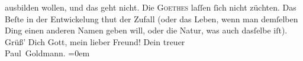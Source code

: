 \begin{ledgroupsized}[t]{13cm}
               ausbilden wollen, und das geht nicht. Die \textsc{Goethes} laſſen ſich nicht züchten. Das
               Beſte in der Entwickelung {\pb}thut der Zufall (oder das
               Leben, wenn man demſelben Ding einen anderen Namen geben will, oder die Natur, was
               auch dasſelbe iſt).\pend
           \pstart
           Grüß’ Dich Gott, mein lieber Freund!\pend
           \pstart
           Dein treuer {\\[\baselineskip]}\spacefill\mbox{Paul Goldmann.}\pend
           \leftskip=0em{}
         
         \endnumbering{}\end{ledgroupsized}  \newcommand{\dateiname}{L02776}\newcommand{\titel}{Paul Goldmann an Arthur Schnitzler, 4. 6. [1896]}\newcommand{\editorInnen}{Martin Anton Müller und Laura Untner}
      